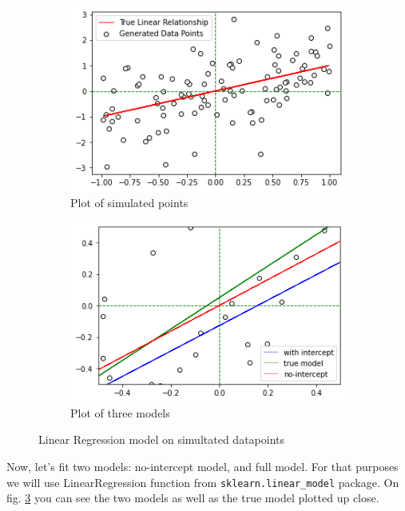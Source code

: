 \documentclass[12pt,a4paper,oneside]{book} %
\newcommand{\code}[1]{\texttt{#1}}
\begin{document}
\begin{figure}
	\begin{subfigure}{0.5\textwidth}
		\centering
		\includegraphics[width=\linewidth]{simulation.png}
		\caption{Plot of simulated points}
		\label{fig:simulation}
	\end{subfigure}%
	\begin{subfigure}{0.5\textwidth}
		\centering
		\includegraphics[width=\linewidth]{threemodels.png}
		\caption{Plot of three models}
		\label{fig:threemodels}
	\end{subfigure}
	\caption{Linear Regression model on simultated datapoints}
\end{figure}


Now, let's fit two models: no-intercept model, and full model. For that purposes we will use LinearRegression function from \code{sklearn.linear\_model} package. On fig. \ref{fig:threemodels} you can see the two models as well as the true model plotted up close.
\end{document}
